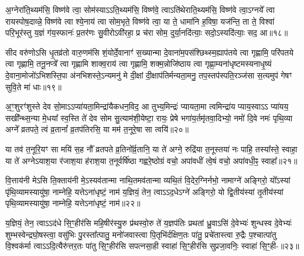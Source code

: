 {\anuvakamend[{मि॒त्रस्य॒ त्रयो॑विꣳशतिश्च॥९॥}]}

अ॒ग्नेरा॑ति॒थ्यम॑सि॒ विष्ण॑वे त्वा॒ सोम॑स्या\-ऽ\-ऽति॒थ्यम॑सि॒ विष्ण॑वे॒ त्वा\-ऽति॑थेराति॒थ्यम॑सि॒ विष्ण॑वे त्वा॒\-ऽग्नये᳚ त्वा रायस्पोष॒दाव्न्ने॒ विष्ण॑वे त्वा श्ये॒नाय॑ त्वा सोम॒भृते॒ विष्ण॑वे त्वा॒ या ते॒ धामा॑नि ह॒विषा॒ यज॑न्ति॒ ता ते॒ विश्वा॑ परि॒भूर॑स्तु य॒ज्ञं ग॑य॒स्फानः॑ प्र॒तर॑णः सु॒वीरो\-ऽवी॑रहा॒ प्र च॑रा सोम॒ दुर्या॒नदि॑त्याः॒ सदो॒\-ऽस्यदि॑त्याः॒ सद॒ आ॥१८॥

सीद वरु॑णो\-ऽसि धृ॒तव्र॑तो वारु॒णम॑सि शं॒योर्दे॒वानाꣳ॑ स॒ख्यान्मा दे॒वाना॑म॒पस॑श्छिथ्स्म॒ह्याप॑तये त्वा गृह्णामि॒ परि॑पतये त्वा गृह्णामि॒ तनू॒नप्त्रे᳚ त्वा गृह्णामि शाक्व॒राय॑ त्वा गृह्णामि॒ शक्म॒न्नोजि॑ष्ठाय त्वा गृह्णा॒म्यना॑धृष्टम\-स्यनाधृ॒ष्यं दे॒वाना॒मोजो॑\-ऽभिशस्ति॒पा अ॑नभिशस्ते॒\-ऽन्यमनु॑ मे दी॒क्षां दी॒क्षाप॑तिर्मन्यता॒मनु॒ तप॒स्तप॑स्पति॒रञ्ज॑सा स॒त्यमुप॑ गेषꣳ सुवि॒ते मा॑ धाः॥१९॥

{\anuvakamend[{आ मैकं॑ च॥10॥}]}

अ॒ꣳ॒शुरꣳ॑शुस्ते देव सो॒मा\-ऽ\-ऽप्या॑यता॒मिन्द्रा॑यैकधन॒विद॒ आ तुभ्य॒मिन्द्रः॑ प्यायता॒मा त्वमिन्द्रा॑य प्याय॒स्वा\-ऽ\-ऽ प्या॑यय॒ सखी᳚न्थ्स॒न्या मे॒धया᳚ स्व॒स्ति ते॑ देव सोम सु॒त्याम॑शी॒येष्टा॒ रायः॒ प्रेषे भगा॑य॒र्तमृ॑तवा॒दिभ्यो॒ नमो॑ दि॒वे नमः॑ पृथि॒व्या अग्ने᳚ व्रतपते॒ त्वं व्र॒तानां᳚ व्र॒तप॑तिरसि॒ या मम॑ त॒नूरे॒षा सा त्वयि॑॥२०॥

या तव॑ त॒नूरि॒यꣳ सा मयि॑ स॒ह नौ᳚ व्रतपते व्र॒तिनो᳚र्व्र॒तानि॒ या ते॑ अग्ने॒ रुद्रि॑या त॒नूस्तया॑ नः पाहि॒ तस्या᳚स्ते॒ स्वाहा॒ या ते॑ अग्ने\-ऽयाश॒या र॑जाश॒या ह॑राश॒या त॒नूर्वर्\mbox{}षि॑ष्ठा गह्वरे॒ष्ठोग्रं वचो॒ अपा॑वधीं त्वे॒षं वचो॒ अपा॑वधी॒ꣴ॒ स्वाहा᳚॥२१॥

{\anuvakamend[{त्वयि॑ चत्वारि॒ꣳ॒शच्च॑॥11॥}]}

वि॒त्ताय॑नी मे\-ऽसि ति॒क्ताय॑नी मे॒\-ऽस्यव॑तान्मा नाथि॒तमव॑तान्मा व्यथि॒तं वि॒देर॒ग्निर्नभो॒ नामाग्ने॑ अङ्गिरो॒ यो᳚\-ऽस्यां पृ॑थि॒व्यामस्यायु॑षा॒ नाम्नेहि॒ यत्ते\-ऽना॑धृष्टं॒ नाम॑ य॒ज्ञियं॒ तेन॒ त्वा\-ऽ\-ऽद॒धे\-ऽग्ने॑ अङ्गिरो॒ यो द्वि॒तीय॑स्यां तृ॒तीय॑स्यां पृथि॒व्यामस्यायु॑षा॒ नाम्नेहि॒ यत्ते\-ऽना॑धृष्टं॒ नाम॑॥२२॥

य॒ज्ञियं॒ तेन॒ त्वा\-ऽ\-ऽद॑धे सि॒ꣳ॒हीर॑सि महि॒षीर॑स्यु॒रु प्र॑थस्वो॒रु ते॑ य॒ज्ञप॑तिः प्रथतां ध्रु॒वा\-ऽसि॑ दे॒वेभ्यः॑ शुन्धस्व दे॒वेभ्यः॑ शुम्भस्वेन्द्रघो॒षस्त्वा॒ वसु॑भिः पु॒रस्ता᳚त्पातु॒ मनो॑जवास्त्वा पि॒तृभि॑र्दक्षिण॒तः पा॑तु॒ प्रचे॑तास्त्वा रु॒द्रैः प॒श्चात्पा॑तु वि॒श्वक॑र्मा त्वा\-ऽ\-ऽदि॒त्यैरु॑त्तर॒तः पा॑तु सि॒ꣳ॒हीर॑सि सपत्नसा॒ही स्वाहा॑ सि॒ꣳ॒हीर॑सि सुप्रजा॒वनिः॒ स्वाहा॑ सि॒ꣳ॒ही-॥२३॥

